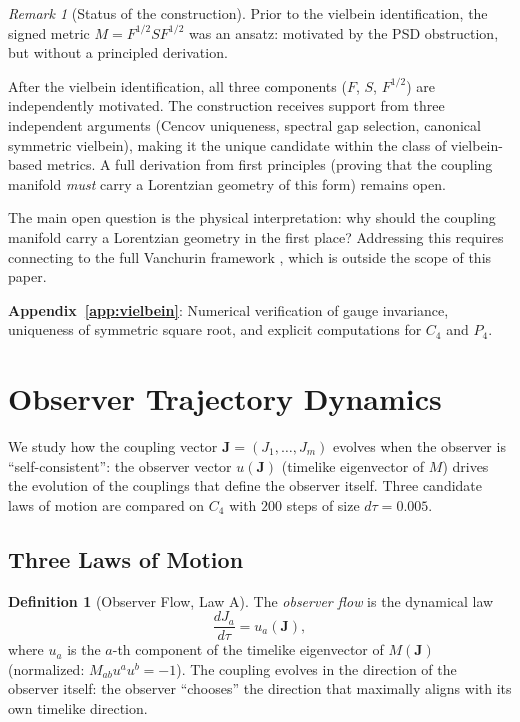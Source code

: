 \documentclass[11pt]{article}
\theoremstyle{definition}
\newtheorem{definition}[theorem]{Definition}
\theoremstyle{remark}
\newtheorem{remark}[theorem]{Remark}
\newcommand{\Fish}{F}
\newcommand{\sgn}{S}
\newcommand{\Met}{M}
\newcommand{\obs}{u}
\newcommand{\coupl}{\mathbf{J}}
\begin{document}
\begin{remark}[Status of the construction]
Prior to the vielbein identification, the signed metric $\Met = \Fish^{1/2}\sgn\Fish^{1/2}$
was an ansatz: motivated by the PSD obstruction, but without a principled
derivation.

After the vielbein identification, all three components ($\Fish$, $\sgn$,
$\Fish^{1/2}$) are independently motivated. The construction receives
support from three independent arguments (Cencov uniqueness, spectral gap
selection, canonical symmetric vielbein), making it the unique candidate
within the class of vielbein-based metrics.
A full derivation from first principles (proving that the coupling
manifold \emph{must} carry a Lorentzian geometry of this form) remains open.

The main open question is the physical interpretation:
why should the coupling manifold carry a Lorentzian geometry in the first
place? Addressing this requires connecting to the full Vanchurin framework
\cite{Paper1}, which is outside the scope of this paper.
\end{remark}

\textbf{Appendix~\ref{app:vielbein}}: Numerical verification of gauge
invariance, uniqueness of symmetric square root, and explicit computations
for $C_4$ and $P_4$.


\section{Observer Trajectory Dynamics}
\label{sec:dynamics}

We study how the coupling vector $\coupl = (J_1, \ldots, J_m)$
evolves when the observer is ``self-consistent'': the observer vector
$\obs(\coupl)$ (timelike eigenvector of $\Met$) drives the evolution
of the couplings that define the observer itself. Three candidate
laws of motion are compared on $C_4$ with $200$ steps of size
$d\tau = 0.005$.

\subsection{Three Laws of Motion}
\label{subsec:three-laws}

\begin{definition}[Observer Flow, Law A]
\label{def:law-a}
The \emph{observer flow} is the dynamical law
\begin{equation}
  \frac{dJ_a}{d\tau} = \obs_a(\coupl),
  \label{eq:law-a}
\end{equation}
where $\obs_a$ is the $a$-th component of the timelike eigenvector
of $\Met(\coupl)$ (normalized: $\Met_{ab}\obs^a\obs^b = -1$).
The coupling evolves in the direction of the observer itself: the
observer ``chooses'' the direction that maximally aligns with its
own timelike direction.
\end{definition}
\end{document}
